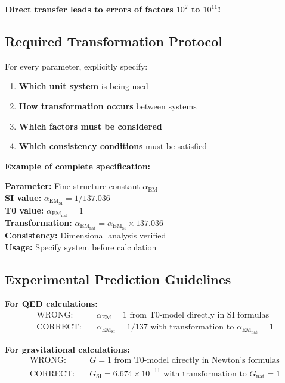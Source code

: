 \documentclass[12pt,a4paper]{article}
\newcommand{\alphaEM}{\alpha_{\text{EM}}}
\begin{document}
	\textbf{Direct transfer leads to errors of factors $10^2$ to $10^{11}$!}
	
	\subsection{Required Transformation Protocol}
	\label{subsec:transformation_protocol}
	
	For every parameter, explicitly specify:
	
	\begin{enumerate}
		\item \textbf{Which unit system} is being used
		\item \textbf{How transformation occurs} between systems
		\item \textbf{Which factors must be considered}
		\item \textbf{Which consistency conditions} must be satisfied
	\end{enumerate}
	
	\textbf{Example of complete specification:}
	\begin{tcolorbox}[colback=red!5!white,colframe=red!75!black,title=Parameter Specification Template]
		\textbf{Parameter:} Fine structure constant $\alphaEM$ \\
		\textbf{SI value:} $\alphaEM_{\text{SI}} = 1/137.036$ \\
		\textbf{T0 value:} $\alphaEM_{\text{nat}} = 1$ \\
		\textbf{Transformation:} $\alphaEM_{\text{nat}} = \alphaEM_{\text{SI}} \times 137.036$ \\
		\textbf{Consistency:} Dimensional analysis verified \\
		\textbf{Usage:} Specify system before calculation
	\end{tcolorbox}
	
	\subsection{Experimental Prediction Guidelines}
	\label{subsec:experimental_guidelines}
	
	\textbf{For QED calculations:}
	\begin{align}
		\text{WRONG:} \quad &\alphaEM = 1 \text{ from T0-model directly in SI formulas} \\
		\text{CORRECT:} \quad &\alphaEM_{\text{SI}} = 1/137 \text{ with transformation to } \alphaEM_{\text{nat}} = 1
	\end{align}
	
	\textbf{For gravitational calculations:}
	\begin{align}
		\text{WRONG:} \quad &G = 1 \text{ from T0-model directly in Newton's formulas} \\
		\text{CORRECT:} \quad &G_{\text{SI}} = 6.674 \times 10^{-11} \text{ with transformation to } G_{\text{nat}} = 1
	\end{align}
	
\end{document}
